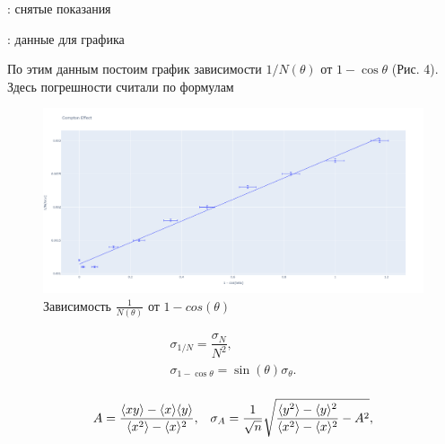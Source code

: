 \documentclass[15pt,a5paper,reqno]{article}
\begin{document}
\begin{table}[h!]
	\centering
	
	\caption{: снятые показания}
\label{tb1}
\end{table}  

\begin{table}[h!]
	\centering
	
	\caption{: данные для графика}
\label{tb2}
\end{table}

По этим данным постоим график зависимости $1/N(\theta)$ от $1-\cos \theta$ (Рис. 4). Здесь погрешности считали по формулам

\begin{figure}[h!]
  \centering
  \includegraphics[width=1.0\linewidth]{pics/grph_5_1_2.png}
  \caption{Зависимость $\frac{1}{N(\theta)}$ от $1 - cos(\theta)$}
\label{grph}
\end{figure}

\[\begin{array}{l}
\sigma_{1/N} = \dfrac{\sigma_N}{N^2},\\
\sigma_{1-\cos \theta} = \sin(\theta) \sigma_\theta.\\
\end{array}\]



\[\begin{array}{l l}
A = \dfrac{\langle xy \rangle - \langle x \rangle \langle y \rangle}{\langle x^2 \rangle - \langle x \rangle^2}, & \sigma_A = \dfrac{1}{\sqrt{n}}\sqrt{\dfrac{\langle y^2 \rangle - \langle y \rangle^2}{\langle x^2 \rangle - \langle x \rangle^2} - A^2},\\
\end{array}\]
\end{document}
